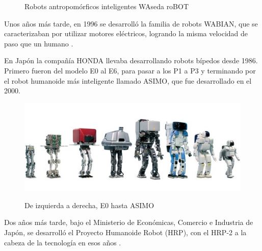 \begin{figure}[H]
\caption{Robots antropomórficos inteligentes WAseda roBOT \cite{ref34}}
\label{figura211}
\end{figure}

Unos años más tarde, en 1996 se desarrolló la familia de robots WABIAN, que se caracterizaban por utilizar motores eléctricos, logrando la misma velocidad de paso que un humano \cite{ref8}.

En Japón la compañía HONDA llevaba desarrollando robots bípedos desde 1986. Primero fueron del modelo E0 al E6, para pasar a los P1 a P3 y terminando por el robot humanoide más inteligente llamado ASIMO, que fue desarrollado en el 2000.

\begin{figure}[H]
\centering
{\includegraphics[scale=0.7]{imagenes/apartado_2/212_evolucion_Honda_robots}}
\caption{De izquierda a derecha, E0 hasta ASIMO}
\label{figura212}
\end{figure}

Dos años más tarde, bajo el Ministerio de Económicas, Comercio e Industria de Japón, se desarrolló el Proyecto Humanoide Robot (HRP), con el HRP-2 a la cabeza de la tecnología en esos años \cite{ref22}.

